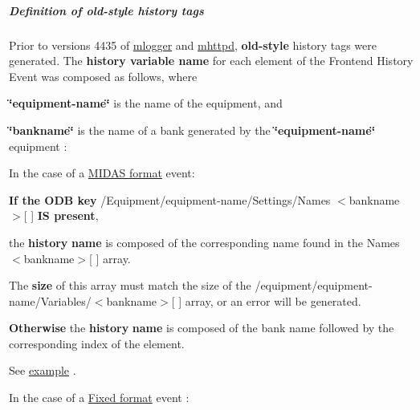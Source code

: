 \label{F_History_logging_idx_history_tags_old}
\hypertarget{F_History_logging_idx_history_tags_old}{}
\hypertarget{F_History_logging_F_history_old_tags}{}\subparagraph{Definition of old-\/style history tags}\label{F_History_logging_F_history_old_tags}
Prior to versions 4435 of \hyperlink{F_Logging_F_mlogger_utility}{mlogger} and \hyperlink{RC_mhttpd_utility}{mhttpd}, {\bfseries old-\/style} history tags were generated. The {\bfseries history variable name} for each element of the Frontend History Event was composed as follows, where 
\begin{DoxyItemize}
\item {\bfseries \char`\"{}equipment-\/name\char`\"{}} is the name of the equipment, and 
\item {\bfseries \char`\"{}bankname\char`\"{}} is the name of a bank generated by the {\bfseries \char`\"{}equipment-\/name\char`\"{}} equipment :


\begin{DoxyItemize}
\item In the case of a \hyperlink{FE_Data_format_FE_Midas_format}{MIDAS format} event:


\begin{DoxyItemize}
\item {\bfseries If the ODB key} /Equipment/equipment-\/name/Settings/Names $<$bankname$>$\mbox{[} \mbox{]} {\bfseries IS present}, 
\begin{DoxyItemize}
\item the {\bfseries history} {\bfseries name} is composed of the corresponding name found in the  Names $<$bankname$>$\mbox{[} \mbox{]} array. 
\item The {\bfseries size} of this array must match the size of the /equipment/equipment-\/name/Variables/$<$bankname$>$\mbox{[} \mbox{]} array, or an error will be generated. 
\end{DoxyItemize}
\item {\bfseries Otherwise} the {\bfseries history} {\bfseries name} is composed of the bank name followed by the corresponding index of the element. 
\end{DoxyItemize}See \hyperlink{RC_mhttpd_Equipment_page_RC_mhttpd_Equipment_example4}{example} .


\item In the case of a \hyperlink{FE_bank_construction_FE_FIXED_event_readout}{Fixed format} event :



\end{DoxyItemize}
\end{DoxyItemize}

